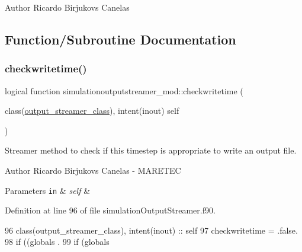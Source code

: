 \begin{DoxyAuthor}{Author}
Ricardo Birjukovs Canelas 
\end{DoxyAuthor}


\subsection{Function/\+Subroutine Documentation}
\mbox{\label{namespacesimulationoutputstreamer__mod_a81b788c12b0520901e6fc9b113a10dec}} 
\subsubsection{\texorpdfstring{checkwritetime()}{checkwritetime()}}
{\footnotesize\ttfamily logical function simulationoutputstreamer\+\_\+mod\+::checkwritetime (\begin{DoxyParamCaption}\item[{class(\mbox{\hyperlink{structsimulationoutputstreamer__mod_1_1output__streamer__class}{output\+\_\+streamer\+\_\+class}}), intent(inout)}]{self }\end{DoxyParamCaption})\hspace{0.3cm}{\ttfamily [private]}}



Streamer method to check if this timestep is appropriate to write an output file. 

\begin{DoxyAuthor}{Author}
Ricardo Birjukovs Canelas -\/ M\+A\+R\+E\+T\+EC 
\end{DoxyAuthor}

\begin{DoxyParams}[1]{Parameters}
\mbox{\tt in}  & {\em self} & \\
\hline
\end{DoxyParams}


Definition at line 96 of file simulation\+Output\+Streamer.\+f90.


\begin{DoxyCode}
96     \textcolor{keywordtype}{class}(output\_streamer\_class), \textcolor{keywordtype}{intent(inout)} :: self
97     checkwritetime = .false.
98     \textcolor{keywordflow}{if} ((globals%
      .
99     \textcolor{keywordflow}{if} (globals%
\end{DoxyCode}
\mbox{\label{namespacesimulationoutputstreamer__mod_adc0f21d337c283eee1f5f13b2eb51d52}} 
